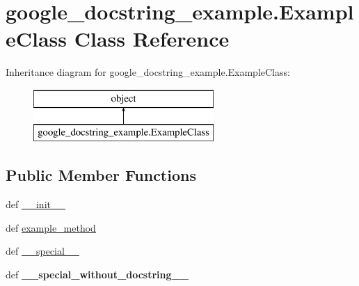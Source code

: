 \hypertarget{classgoogle__docstring__example_1_1ExampleClass}{\section{google\-\_\-docstring\-\_\-example.\-Example\-Class Class Reference}
\label{classgoogle__docstring__example_1_1ExampleClass}
}
Inheritance diagram for google\-\_\-docstring\-\_\-example.\-Example\-Class\-:\begin{figure}[H]
\begin{center}
\leavevmode
\includegraphics[height=2.000000cm]{classgoogle__docstring__example_1_1ExampleClass}
\end{center}
\end{figure}
\subsection*{Public Member Functions}
\begin{DoxyCompactItemize}
\item 
def \hyperlink{classgoogle__docstring__example_1_1ExampleClass_a6fde9c776090979b1bdd97ab905cdebf}{\-\_\-\-\_\-init\-\_\-\-\_\-}
\item 
def \hyperlink{classgoogle__docstring__example_1_1ExampleClass_aa1788edcf36597ca202110e4f1e540a1}{example\-\_\-method}
\item 
def \hyperlink{classgoogle__docstring__example_1_1ExampleClass_a1d452ef6f6945b82952f17b1b2948ddc}{\-\_\-\-\_\-special\-\_\-\-\_\-}
\item 
\hypertarget{classgoogle__docstring__example_1_1ExampleClass_a32c333c513d78d5b1af25b9d2f0494d2}{def {\bfseries \-\_\-\-\_\-special\-\_\-without\-\_\-docstring\-\_\-\-\_\-}}\label{classgoogle__docstring__example_1_1ExampleClass_a32c333c513d78d5b1af25b9d2f0494d2}

\end{DoxyCompactItemize}
